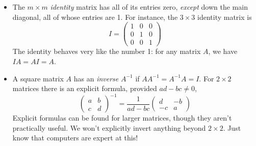 \begin{itemize}
  \item The $m\times m$ \emph{identity} matrix has all of its entries zero, \emph{except} down the main diagonal, all of whose entries are 1. For instance, the $3\times 3$ identity matrix is
  \[I=\begin{pmatrix}
  1&0&0\\0&1&0\\0&0&1
  \end{pmatrix}\]
  The identity behaves very like the number 1: for any matrix $A$, we have $IA=AI=A$.
  \item A square matrix $A$ has an \emph{inverse} $A^{-1}$ if
  $AA^{-1}=A^{-1}A=I$.
  For $2\times 2$ matrices there is an explicit formula, provided $ad-bc\neq 0$,
  \[\begin{pmatrix}
  a&b\\c&d
  \end{pmatrix}^{-1}
  =\frac 1{ad-bc}\begin{pmatrix}
  d&-b\\-c&a
  \end{pmatrix}
  \]
  Explicit formulas can be found for larger matrices, though they aren't practically useful. We won't explicitly invert anything beyond $2\times 2$. Just know that computers are expert at this!
\end{itemize}
\fi

